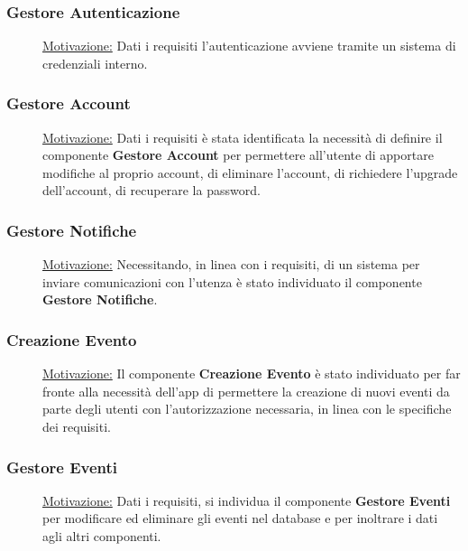 \documentclass{article}
\begin{document}
\subsubsection{Gestore Autenticazione}
\begin{description}
    \item[] \underline{Motivazione:} Dati i requisiti l'autenticazione avviene tramite un sistema di credenziali interno. \\
\end{description}
\subsubsection{Gestore Account}
\begin{description}
    \item[] \underline{Motivazione:}
        Dati i requisiti è stata identificata la necessità di definire il componente \textbf{Gestore Account} per permettere all'utente di apportare modifiche al proprio account, di eliminare l'account, di richiedere l'upgrade dell'account, di recuperare la password.
\end{description}
\subsubsection{Gestore Notifiche}
\begin{description}
    \item[] \underline{Motivazione:}
        Necessitando, in linea con i requisiti, di un sistema per inviare comunicazioni con l'utenza è stato individuato il componente \textbf{Gestore Notifiche}.
\end{description}
\subsubsection{Creazione Evento}
\begin{description}
    \item[] \underline{Motivazione:}
        Il componente \textbf{Creazione Evento} è stato individuato per far fronte alla necessità dell'app di permettere la creazione di nuovi eventi da parte degli utenti con l'autorizzazione necessaria, in linea con le specifiche dei requisiti.
\end{description}
\subsubsection{Gestore Eventi}
\begin{description}
    \item[] \underline{Motivazione:} Dati i requisiti, si individua il componente \textbf{Gestore Eventi} per modificare ed eliminare gli eventi nel database e per inoltrare i dati agli altri componenti.
\end{description}
\end{document}
